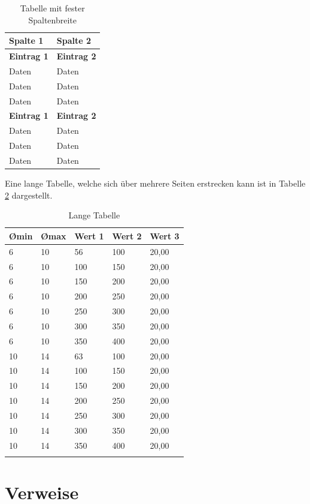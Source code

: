 \begin{table}[htbp]
\centering
\begin{tabular}{p{3.5cm} p{5.5cm}}
\toprule
\textbf{Spalte 1}  & \textbf{Spalte 2}\\
\midrule
\textbf{Eintrag 1} & \textbf{Eintrag 2}\\
Daten              & Daten\\
Daten              & Daten\\
Daten              & Daten\\
\midrule
\textbf{Eintrag 1} & \textbf{Eintrag 2}\\
Daten              & Daten\\
Daten              & Daten\\
Daten              & Daten\\
\bottomrule
\end{tabular}
\caption{Tabelle mit fester Spaltenbreite}
\label{tab:feste-breite}
\end{table}

Eine lange Tabelle, welche sich über mehrere Seiten erstrecken kann ist in Tabelle \ref{tab:lange-tabelle} dargestellt.

\begin{longtable}{p{2cm} p{2cm} p{2cm} p{2cm} p{2cm}}
\toprule
\textbf{\O min}& \textbf{\O max}& \textbf{Wert 1}& \textbf{Wert 2}& \textbf{Wert 3}\\
\midrule
 6& 10&  56& 100& 20,00\\
 6& 10& 100& 150& 20,00\\
 6& 10& 150& 200& 20,00\\
 6& 10& 200& 250& 20,00\\
 6& 10& 250& 300& 20,00\\
 6& 10& 300& 350& 20,00\\
 6& 10& 350& 400& 20,00\\
10& 14&  63& 100& 20,00\\
10& 14& 100& 150& 20,00\\
10& 14& 150& 200& 20,00\\
10& 14& 200& 250& 20,00\\
10& 14& 250& 300& 20,00\\
10& 14& 300& 350& 20,00\\
10& 14& 350& 400& 20,00\\
\bottomrule
\caption{Lange Tabelle}
\label{tab:lange-tabelle}
\end{longtable}

\section{Verweise}

